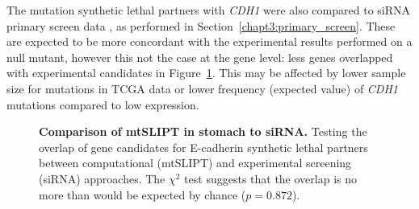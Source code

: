 The mutation synthetic lethal partners with \textit{CDH1} were also compared to \gls{siRNA} primary screen data \citep{Telford2015}, as performed in Section~\ref{chapt3:primary_screen}. These are expected to be more concordant with the experimental results performed on a null mutant, however this not the case at the gene level: less genes overlapped with experimental candidates in Figure~\ref{fig:Venn_allgenes_stad_mtSL}. This may be affected by lower sample size for mutations in \gls{TCGA} data or lower frequency (expected value) of \textit{CDH1} mutations compared to low expression. 

\begin{figure}[!ht]
  \centering
    \caption[Comparison of \acrshort{mtSLIPT} in stomach to \gls{siRNA}]{\small \textbf{Comparison of \acrshort{mtSLIPT} in stomach to \gls{siRNA}.} Testing the overlap of gene candidates for \gls{E-cadherin} synthetic lethal partners between computational (\acrshort{mtSLIPT}) and experimental screening (siRNA) approaches. The $\chi^2$ test suggests that the overlap is no more than would be expected by chance ($p = 0.872$). %
}
\label{fig:Venn_allgenes_stad_mtSL}
\end{figure}


